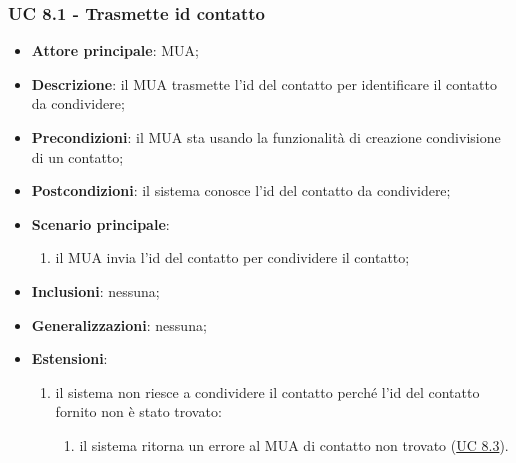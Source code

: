     \subsubsection{UC 8.1 - Trasmette id contatto} \label{sec:UC8.1}
    \begin{itemize}
        \item \textbf{Attore principale}: MUA;
        \item \textbf{Descrizione}: il MUA trasmette l'id del contatto per identificare il contatto da condividere;
        \item \textbf{Precondizioni}: il MUA sta usando la funzionalità di creazione condivisione di un contatto;
        \item \textbf{Postcondizioni}: il sistema conosce l'id del contatto da condividere;
        \item \textbf{Scenario principale}:
            \begin{enumerate}
                \item il MUA invia l'id del contatto per condividere il contatto;
            \end{enumerate}
        \item \textbf{Inclusioni}: nessuna;
        \item \textbf{Generalizzazioni}: nessuna;
        \item \textbf{Estensioni}:
            \begin{enumerate}[label=\alph*.]
                \item il sistema non riesce a condividere il contatto perché l'id del contatto fornito non è stato trovato:
                \begin{enumerate}[label=\arabic*.]
                    \item il sistema ritorna un errore al MUA di contatto non trovato (\hyperref[sec:UC8.3]{UC 8.3}).
                \end{enumerate}
            \end{enumerate}
    \end{itemize}


